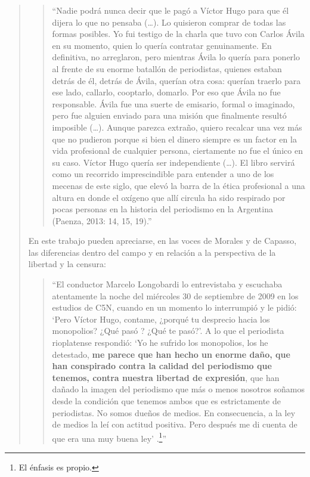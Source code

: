 \begin{quote}
\begin{quote}
	\enquote{Nadie podrá nunca decir que le pagó a Víctor Hugo para que él dijera lo que no pensaba (\dots). Lo quisieron comprar de todas las formas posibles. Yo fui testigo de la charla que tuvo con Carlos Ávila en su momento, quien lo quería contratar genuinamente. En definitiva, no arreglaron, pero mientras Ávila lo quería para ponerlo al frente de su enorme batallón de periodistas, quienes estaban detrás de él, detrás de Ávila, querían otra cosa: querían traerlo para ese lado, callarlo, cooptarlo, domarlo. Por eso  que Ávila no fue responsable. Ávila fue una suerte de emisario, formal o imaginado, pero fue alguien enviado para una misión que finalmente resultó imposible (\dots). Aunque parezca extraño, quiero recalcar una vez más que no pudieron porque si bien el dinero siempre es un factor en la vida profesional de cualquier persona, ciertamente no fue el único en su caso. Víctor Hugo quería ser independiente (\dots). El libro servirá como un recorrido imprescindible para entender a uno de los mecenas de este siglo, que elevó la barra de la ética profesional a una altura en donde el oxígeno que allí circula ha sido respirado por pocas personas en la historia del periodismo en la Argentina (Paenza, 2013: 14, 15, 19).}
\end{quote}


En este trabajo pueden apreciarse, en las voces de Morales y de Capasso, las diferencias dentro del campo y en relación a la perspectiva de la libertad y la censura:

\begin{quote}
	\enquote{El conductor Marcelo Longobardi lo entrevistaba y escuchaba atentamente la noche del miércoles 30 de septiembre de 2009 en los estudios de C5N, cuando en un momento lo interrumpió y le pidió: \enquote{Pero Víctor Hugo, contame, ¿porqué tu desprecio hacia los monopolios? ¿Qué pasó ? ¿Qué te pasó?}. A lo que el periodista rioplatense respondió: \enquote{Yo he sufrido los monopolios, los he detestado, \textbf{me parece que han hecho un enorme daño, que han conspirado contra la calidad del periodismo que tenemos, contra nuestra libertad de expresión}, que han dañado la imagen del periodismo que más o menos nosotros soñamos desde la condición que tenemos ambos que es estrictamente de periodistas. No somos dueños de medios. En consecuencia, a la ley de medios la leí con actitud positiva. Pero después me di cuenta de que era una muy buena ley} \parencite[121]{@6974-CAPASSO2013}.\footnote{El énfasis es propio.}}
\end{quote}



\end{quote}
